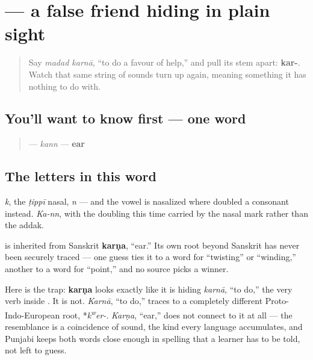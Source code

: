 \section[\texorpdfstring{\pa{ਕੰਨ} (kann)}{ਕੰਨ (kann)}]{ — a false friend hiding in plain sight}

\label{lesson:PA-C12-kann}



\begin{quote}
Say \emph{madad karnā}, \textquotedblleft{}to do a favour of help,\textquotedblright{} and pull its stem apart: \textbf{kar-}. Watch that same string of sounds turn up again, meaning something it has nothing to do with.
\end{quote}

\subsection*{You'll want to know first — one word}
\begin{quote}
\textbf{} — \emph{kann} — \textbf{ear}
\end{quote}

\subsection*{The letters in this word}
\textbf{} \emph{k}, \textbf{} the \emph{ṭippī} nasal, \textbf{} \emph{n} — and the vowel is nasalized where \textbf{} doubled a consonant instead. \emph{Ka-nn}, with the doubling this time carried by the nasal mark rather than the addak.

\begin{cousinweb}
\textbf{} is inherited from Sanskrit \textbf{karṇa}, \textquotedblleft{}ear.\textquotedblright{} Its own root beyond Sanskrit has never been securely traced — one guess ties it to a word for \textquotedblleft{}twisting\textquotedblright{} or \textquotedblleft{}winding,\textquotedblright{} another to a word for \textquotedblleft{}point,\textquotedblright{} and no source picks a winner.

Here is the trap: \textbf{karṇa} looks exactly like it is hiding \textbf{} \emph{karnā}, \textquotedblleft{}to do,\textquotedblright{} the very verb inside \textbf{ }. It is not. \emph{Karnā}, \textquotedblleft{}to do,\textquotedblright{} traces to a completely different Proto-Indo-European root, *\emph{k\textsuperscript{w}er-}. \emph{Karṇa}, \textquotedblleft{}ear,\textquotedblright{} does not connect to it at all — the resemblance is a coincidence of sound, the kind every language accumulates, and Punjabi keeps both words close enough in spelling that a learner has to be told, not left to guess.
\end{cousinweb}

